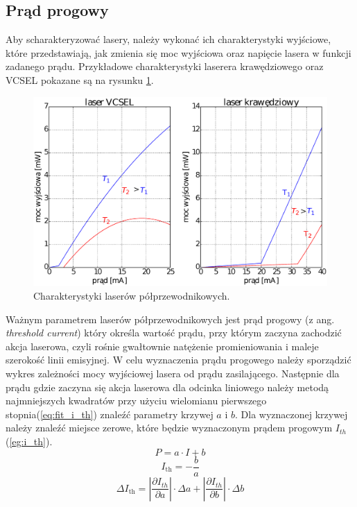 \subsection{Prąd progowy}
Aby scharakteryzować lasery, należy wykonać ich charakterystyki wyjściowe, które przedstawiają, jak zmienia się moc wyjściowa oraz
napięcie lasera w funkcji zadanego prądu.
Przykładowe charakterystyki laserera krawędziowego oraz VCSEL pokazane są na rysunku \ref{fig:teoria_rys_1}.
\begin{figure}
\center
  \includegraphics[scale=0.30]{wykres2.eps}
  \caption{Charakterystyki laserów półprzewodnikowych.}
  \label{fig:teoria_rys_1}
\end{figure}
Ważnym parametrem laserów półprzewodnikowych jest prąd progowy (z ang. \textit{threshold
current}) który określa wartość prądu, przy którym zaczyna zachodzić akcja laserowa, czyli
rośnie gwałtownie natężenie promieniowania i maleje szerokość linii emisyjnej. W celu wyznaczenia prądu progowego należy
sporządzić wykres zależności mocy wyjściowej lasera od prądu zasilającego. Następnie dla prądu gdzie zaczyna się akcja
laserowa dla odcinka liniowego należy metodą najmniejszych kwadratów przy użyciu wielomianu pierwszego stopnia(\ref{eq:fit_i_th})
 znaleźć parametry krzywej $a$ i $b$.
 Dla wyznaczonej krzywej należy znaleźć miejsce zerowe, które będzie wyznaczonym prądem progowym $I_{th}$(\ref{eg:i_th}).
\begin{equation}
\label{eq:fit_i_th}
P = a \cdot I + b
\end{equation}
\begin{equation}
\label{eg:i_th}
I_{\mathrm{th}} = -\frac{b}{a}
\end{equation}
\begin{equation}
\Delta I_{\mathrm{th}} = \left\lvert \frac{\partial I_{th}}{\partial a} \right\rvert \cdot \Delta a + \left\lvert \frac{\partial I_{th}}{\partial b} \right\rvert \cdot \Delta b
\end{equation}
